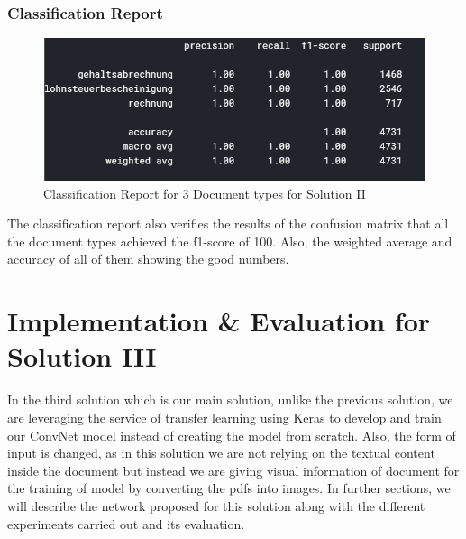 \subsubsection{Classification Report}
\begin{figure}[H]
\centering
\includegraphics[scale=0.9]{images/Chapter5/sol_2/classification_report.png}
\caption{Classification Report for 3 Document types  for Solution II}
\label{cr_sol2}
\end{figure}
\par
The classification report also verifies the results of the confusion matrix that all the document types achieved the f1-score of 100. Also, the weighted average and accuracy of all of them showing the good numbers.
\section{Implementation \& Evaluation for Solution III}
In the third solution which is our main solution, unlike the previous solution, we are leveraging the service of transfer learning using Keras to develop and train our ConvNet model instead of creating the model from scratch. Also, the form of input is changed, as in this solution we are not relying on the textual content inside the document but instead we are giving visual information of document for the training of model by converting the pdfs into images. In further sections, we will describe the network proposed for this solution along with the different experiments carried out and its evaluation.
